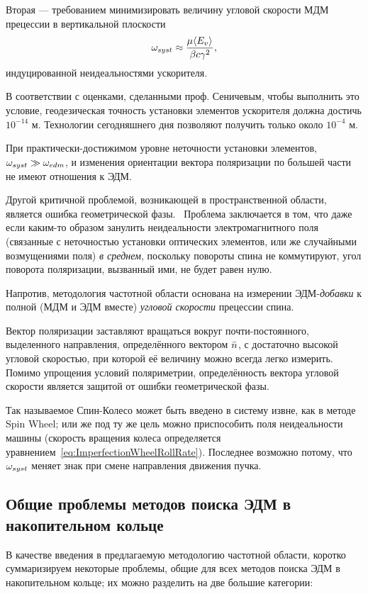 Вторая --- требованием минимизировать величину угловой скорости МДМ прецессии в 
вертикальной плоскости~\cite[стр.~11]{BNL:Deuteron2008}
\begin{equation}\label{eq:ImperfectionWheelRollRate}
	\w_{syst} \approx \frac{\mu\avg{E_v}}{\beta c\gamma^2},
\end{equation}
индуцированной неидеальностями ускорителя. 

В соответствии с оценками, сделанными проф. Сеничевым, чтобы выполнить это условие,
геодезическая точность установки элементов ускорителя должна достичь $10^{-14}$ м. 
Технологии сегодняшнего дня позволяют получить только около $10^{-4}$ м.

При практически-достижимом уровне неточности установки элементов, $\omega_{syst}\gg\omega_{edm}$,
и изменения ориентации вектора поляризации по большей части не имеют отношения к ЭДМ.

Другой критичной проблемой, возникающей в пространственной области, является ошибка
геометрической фазы.~\cite[стр.~6]{BNL:Proton}  Проблема заключается в том, что даже если
каким-то образом занулить неидеальности электромагнитного поля (связанные с неточностью
установки оптических элементов, или же случайными возмущениями поля) \emph{в среднем},
поскольку повороты спина не коммутируют, угол поворота поляризации, вызванный ими, не 
будет равен нулю.

Напротив, методология частотной области основана на измерении ЭДМ-\emph{добавки} к полной
(МДМ и ЭДМ вместе) \emph{угловой скорости} прецессии спина.

Вектор поляризации заставляют вращаться вокруг почти-постоянного, выделенного направления,
определённого вектором $\bar n$, с достаточно высокой угловой скоростью, при которой её
величину можно всегда легко измерить. Помимо упрощения условий поляриметрии, определённость
вектора угловой скорости является защитой от ошибки геометрической фазы.

Так называемое Спин-Колесо может быть введено в систему извне, как в методе Spin Wheel; или же
под ту же цель можно приспособить поля неидеальности машины (скорость вращения колеса 
определяется уравнением~\eqref{eq:ImperfectionWheelRollRate}). Последнее возможно потому,
что $\omega_{syst}$ меняет знак при смене направления движения пучка.~\cite[стр.~11]{BNL:Deuteron2008}

\subsection{Общие проблемы методов поиска ЭДМ в накопительном кольце}\label{sec:FSSREDM:problems}
В качестве введения в предлагаемую методологию частотной области, коротко суммаризируем 
некоторые проблемы, общие для всех методов поиска ЭДМ в накопительном кольце; их можно
разделить на две большие категории:

